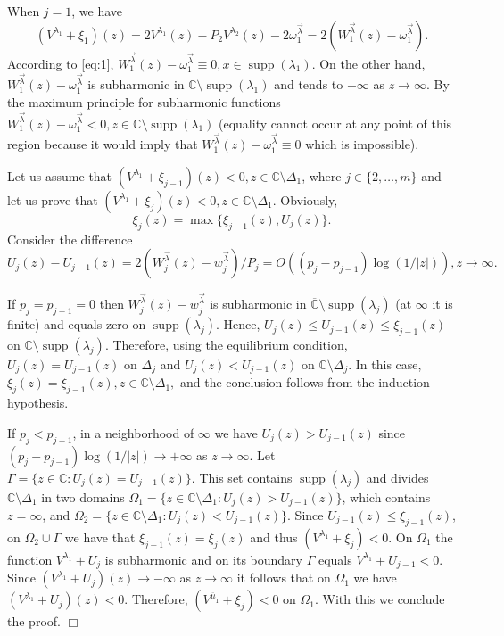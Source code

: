 \documentclass{amsart}
\theoremstyle{definition}
\theoremstyle{remark}
\newcommand{\supp}{\operatorname{supp }}
\begin{document}
When $j=1$, we have
\[ (V^{\lambda_1} + \xi_1)(z) = 2 V^{\lambda_1}(z) - P_2 V^{\lambda_2}(z) -2\omega_1^{\vec{\lambda}} = 2(W_1^{\vec{\lambda}}(z) - \omega_1^{\vec{\lambda}}).
\]
According to \eqref{eq:1}, $W_1^{\vec{\lambda}}(z) - \omega_1^{\vec{\lambda}} \equiv 0, x \in \supp(\lambda_1)$. On the other hand, $W_1^{\vec{\lambda}}(z) - \omega_1^{\vec{\lambda}} $ is subharmonic in ${\mathbb{C}} \setminus \supp(\lambda_1)$ and tends to $-\infty$ as $z \to \infty$. By the maximum principle for subharmonic functions $W_1^{\vec{\lambda}}(z) - \omega_1^{\vec{\lambda}} < 0, z \in {\mathbb{C}} \setminus \supp(\lambda_1)$ (equality cannot occur at any point of this region because it would imply that $W_1^{\vec{\lambda}}(z) - \omega_1^{\vec{\lambda}} \equiv  0$ which is impossible).

Let us assume that $(V^{\lambda_1}
+ \xi_{j-1})(z) < 0, z \in \mathbb{C} \setminus \Delta_1$, where $j \in
\{2,\ldots,m\}$ and let us prove that $(V^{\lambda_1}
+ \xi_{j})(z) < 0, z \in \mathbb{C} \setminus \Delta_1$.
Obviously,
\[ \xi_j(z) = \max\{\xi_{j-1}(z),U_j(z)\}.\]
Consider the
difference
\[ U_j(z) - U_{j-1}(z) = 2(W_j^{\vec{\lambda}}(z) -
w_j^{\vec{\lambda}})/P_j =
O\left((p_{j}-p_{j-1})\log({1}/{|z|})\right), z \to
\infty.
\]

If $p_{j}=p_{j-1} = 0$ then $W_j^{\vec{\lambda}}(z) -
w_j^{\vec{\lambda}}$ is subharmonic in $\overline{\mathbb{C}}
\setminus \supp(\lambda_j)$ (at $\infty$ it is finite) and equals zero on
$\supp( \lambda_j)$. Hence, $U_j(z) \leq U_{j-1}(z) \leq
\xi_{j-1}(z)$ on $ {\mathbb{C}} \setminus
\supp(\lambda_j)$. Therefore, using the equilibrium
condition, $U_j(z) = U_{j-1}(z)$ on $\Delta_j$ and $U_j(z) <
U_{j-1}(z)$ on $ {\mathbb{C}} \setminus \Delta_j$. In this
case, $\xi_j(z) = \xi_{j-1}(z), z \in \mathbb{C} \setminus \Delta_1,$ and the conclusion
follows from the induction hypothesis.

If $p_{j} < p_{j -1}$, in a neighborhood of $\infty$ we
have $U_j(z) > U_{j-1}(z)$ since
$(p_{j}-p_{j-1})\log({1}/{|z|}) \to +\infty$ as $z
\to \infty.$ Let $\Gamma = \{z \in \mathbb{C}: U_j(z) = U_{j-1}(z)\}$. This
set contains $\supp( {\lambda}_j)$ and divides $\mathbb{C} \setminus \Delta_1$ in two
domains $\Omega_1 = \{z \in\mathbb{C} \setminus \Delta_1: U_j(z) > U_{j-1}(z)\}$, which
contains $z= \infty$, and $\Omega_2 = \{z \in \mathbb{C} \setminus \Delta_1: U_j(z) <
U_{j-1}(z)\}$. Since $U_{j-1}(z) \leq \xi_{j-1}(z)$,   on
$\Omega_2 \cup \Gamma$ we have that $\xi_{j-1}(z) = \xi_{j}(z)$
and thus  $(V^{\lambda_1} + \xi_{j}) < 0$.   On
$\Omega_1$ the function $V^{\lambda_1} + U_{j}$ is
subharmonic and on its boundary $\Gamma$ equals
$V^{\lambda_1} + U_{j-1} < 0$. Since
$(V^{\lambda_1} +   U_{j})(z) \to -\infty$ as $z \to
\infty$ it follows that on $\Omega_1$ we have
$(V^{\lambda_1} + U_{j})(z) < 0$. Therefore,
$(V^{\overline{\mu}_1} + \xi_{j}) < 0$ on $\Omega_1$. With
this we conclude the proof. \hfill $\Box$
\end{document}
